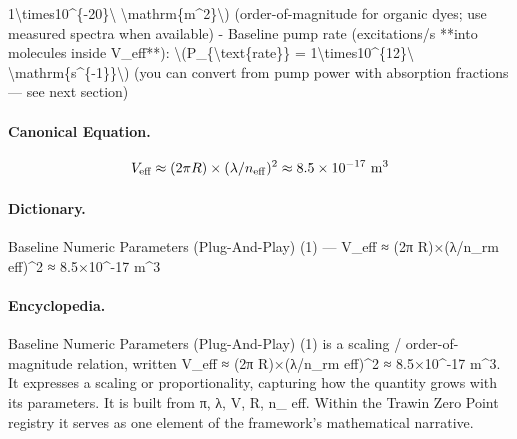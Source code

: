 1\textbackslash{}times10\textasciicircum{}\{-20\}\textbackslash{} \textbackslash{}mathrm\{m\textasciicircum{}2\}\textbackslash{}) (order-of-magnitude for organic dyes; use measured spectra when available) - Baseline pump rate (excitations/s **into molecules inside V\_eff**): \textbackslash{}(P\_\{\textbackslash{}text\{rate\}\} = 1\textbackslash{}times10\textasciicircum{}\{12\}\textbackslash{} \textbackslash{}mathrm\{s\textasciicircum{}\{-1\}\}\textbackslash{}) (you can convert from pump power with absorption fractions — see next section)

\paragraph{Canonical Equation.}
\[
V_\text{eff} \approx (2\pi R)\times(\lambda/n_{\rm eff})^2 \approx 8.5\times10^{-17}\ \mathrm{m^3}
\]

\paragraph{Dictionary.}
Baseline Numeric Parameters (Plug-And-Play) (1) — V\_eff ≈ (2π R)×(λ/n\_rm eff)\textasciicircum{}2 ≈ 8.5×10\textasciicircum{}-17 m\textasciicircum{}3

\paragraph{Encyclopedia.}
Baseline Numeric Parameters (Plug-And-Play) (1) is a scaling / order-of-magnitude relation, written V\_eff ≈ (2π R)×(λ/n\_rm eff)\textasciicircum{}2 ≈ 8.5×10\textasciicircum{}-17 m\textasciicircum{}3. It expresses a scaling or proportionality, capturing how the quantity grows with its parameters. It is built from π, λ, V, R, n\_ eff. Within the Trawin Zero Point registry it serves as one element of the framework's mathematical narrative.
